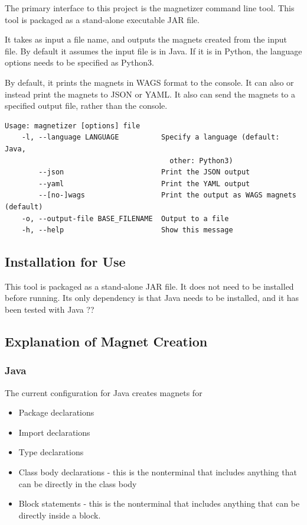 \documentclass[letter,10pt]{article}
\begin{document}
The primary interface to this project is the magnetizer command line 
tool.  This tool is packaged as a stand-alone executable JAR file. 

It takes as input a file name, and outputs the magnets created 
from the input file. By default it assumes the input file is in Java. 
If it is in Python, the language options needs to be specified as 
Python3. 

By default, it prints the magnets in WAGS format to the console. It can 
also or instead print the magnets to JSON or YAML. It also can 
send the magnets to a specified output file, rather than the console. 

\begin{verbatim}
Usage: magnetizer [options] file
    -l, --language LANGUAGE          Specify a language (default: Java, 
                                       other: Python3)
        --json                       Print the JSON output
        --yaml                       Print the YAML output
        --[no-]wags                  Print the output as WAGS magnets 
(default)
    -o, --output-file BASE_FILENAME  Output to a file
    -h, --help                       Show this message
\end{verbatim}


\subsection{Installation for Use}
This tool is packaged as a stand-alone JAR file. It does not need to be 
installed before running. Its only dependency is that Java needs to be 
installed, and it has been tested with Java ?? 

\subsection{Explanation of Magnet Creation}


\subsubsection{Java}
The current configuration for Java creates magnets for
\begin{itemize}
 \item Package declarations
 \item Import declarations
 \item Type declarations
 \item Class body declarations - this is the nonterminal that includes 
anything that can be directly in the class body
 \item Block statements - this is the nonterminal that includes 
anything that can be directly inside a block.
\end{itemize}
\end{document}
